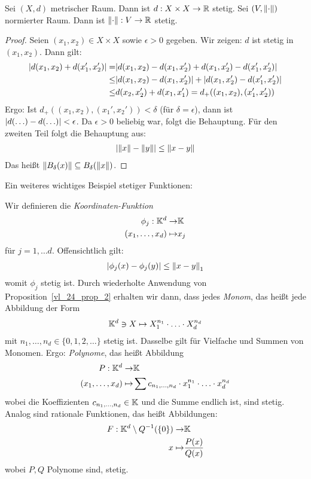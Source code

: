 \begin{Proposition}{%
	Sei $(X,d)$ metrischer Raum. Dann ist $d: X \times X \rightarrow \mathbb{R}$ stetig. 
	Sei $(V, \norm{\cdot})$ normierter Raum. Dann ist $\norm{\cdot} : V \rightarrow 
	\mathbb{R}$ stetig.
}\end{Proposition}

\begin{proof}
	Seien $(x_1, x_2) \in X \times X$ sowie $\epsilon > 0$ gegeben. Wir zeigen: 
	$d$ ist stetig in $(x_1, x_2)$.
	Dann gilt:
	\begin{align*}
		\abs{d(x_1,x_2) + d(x_1', x_2')} = & 
		\abs{d(x_1,x_2) - d(x_1, x_2') 
			+ d(x_1,x_2') - d(x_1',x_2')} \\ \leq &
		\abs{d(x_1,x_2) - d(x_1, x_2')} + 
			\abs{d(x_1,x_2')-d(x_1',x_2')} \\ \leq &
		d(x_2, x_2') + d(x_1, x_1') = 
		d_+ ((x_1,x_2), (x_1', x_2'))
	\end{align*}
	Ergo: Ist $d_+((x_1,x_2), (x_1',x_2')) < \delta$ (für $\delta = 
	\epsilon$), dann ist $\abs{d(\hdots) - d(\hdots)} < \epsilon$. 
	Da $\epsilon > 0$ beliebig war, folgt die Behauptung. 
	Für den zweiten Teil folgt die Behauptung aus:
	\begin{align*}
		\abs{\norm{x} - \norm{y}} \leq \norm{x-y}
	\end{align*}
	Das heißt $\norm{B_\delta(x)} \subseteq B_\delta(\norm{x})$.
\end{proof}
Ein weiteres wichtiges Beispiel stetiger Funktionen:
\begin{Beispiel*}
	Wir definieren die \emph{Koordinaten-Funktion}
	\begin{align*}
		\phi_j : \mathbb{K}^d \rightarrow & \mathbb{K} \\
			(x_1, \hdots, x_d) \mapsto & x_j
	\end{align*}
	für $j = 1, \hdots d$. Offensichtlich gilt: 
	\begin{align*}
		\abs{\phi_j(x)-\phi_j(y)} \leq \norm{x-y}_1
	\end{align*}
	womit $\phi_j$ stetig ist. Durch wiederholte Anwendung von 
	Proposition~\ref{vl_24_prop_2} erhalten wir dann, dass jedes \emph{Monom}, 
	das heißt jede Abbildung der Form 
	\begin{align*}
		\mathbb{K}^d \owns X \mapsto X_1^{n_1} \cdot \hdots \cdot X_d^{n_d}
	\end{align*}
	mit $n_1, \hdots , n_d \in \{0,1,2,\hdots \}$ stetig ist.
	Dasselbe gilt für Vielfache und Summen von Monomen. Ergo: \emph{Polynome}, das heißt 
	Abbildung
	\begin{align*}
		P: \mathbb{K}^d \rightarrow & \mathbb{K} \\
		(x_1, \hdots, x_d) \mapsto & \sum c_{n_1, \hdots, n_d} \cdot x_1^{n_1}\cdot 
		\hdots \cdot x_d^{n_d}
	\end{align*}
	wobei die Koeffizienten $c_{n_1,\hdots, n_d} \in \mathbb{K}$ und die Summe endlich ist, 
	sind stetig. Analog sind rationale Funktionen, das heißt Abbildungen:
	\begin{align*}
		F: \mathbb{K}^d \setminus Q^{-1}(\{0\}) \rightarrow & \mathbb{K} \\
		x \mapsto & \frac{P(x)}{Q(x)}
	\end{align*}
	wobei $P,Q$ Polynome sind, stetig.
\end{Beispiel*}